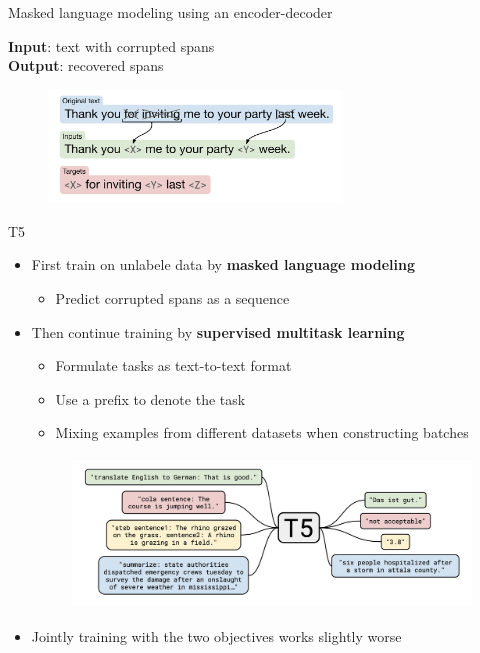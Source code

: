 \documentclass[usenames,dvipsnames,notes,11pt,aspectratio=169,hyperref={colorlinks=true, linkcolor=blue}]{beamer}
\begin{document}
\begin{frame}
    {Masked language modeling using an encoder-decoder}

    \textbf{Input}: text with corrupted spans\\
    \textbf{Output}: recovered spans

    \begin{figure}
        \includegraphics[height=3cm]{figures/t5-span}
    \end{figure}
\end{frame}

\begin{frame}
    {T5}

    \begin{itemize}
        \item First train on unlabele data by \textbf{masked language modeling}
            \begin{itemize}
                \item Predict corrupted spans as a sequence
            \end{itemize}
        \item Then continue training by \textbf{supervised multitask learning}
            \begin{itemize}
                \item Formulate tasks as text-to-text format
                \item Use a prefix to denote the task
                \item Mixing examples from different datasets when constructing batches  
            \end{itemize}
    \begin{figure}
        \includegraphics[height=4cm]{figures/t5-mtl}
    \end{figure}
        \item Jointly training with the two objectives works slightly worse
    \end{itemize}
\end{frame}
\end{document}
